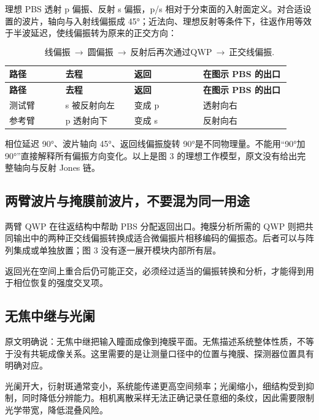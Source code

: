 \documentclass[UTF8,fontset=fandol,11pt,a4paper]{ctexart}
\begin{document}
理想 PBS 透射 p 偏振、反射 s 偏振，p/s 相对于分束面的入射面定义。对合适设置的波片，轴向与入射线偏振成 45°；近法向、理想反射等条件下，往返作用等效于半波延迟，使线偏振转为原来的正交方向：

\[
\text{线偏振}\ \longrightarrow\ \text{圆偏振}\ \longrightarrow\ \text{反射后再次通过QWP}\ \longrightarrow\ \text{正交线偏振}.
\]

{\small
\begin{longtable}{>{\raggedright\arraybackslash}p{0.18\linewidth}>{\raggedright\arraybackslash}p{0.22\linewidth}>{\raggedright\arraybackslash}p{0.22\linewidth}>{\raggedright\arraybackslash}p{0.29\linewidth}}
\toprule
\textbf{路径} & \textbf{去程} & \textbf{返回} & \textbf{在图示 PBS 的出口} \\
\midrule
\endfirsthead
\toprule
\textbf{路径} & \textbf{去程} & \textbf{返回} & \textbf{在图示 PBS 的出口} \\
\midrule
\endhead
测试臂 & s 被反射向左 & 变成 p & 透射向右 \\
参考臂 & p 透射向下 & 变成 s & 反射向右 \\
\bottomrule
\end{longtable}
}

相位延迟 90°、波片轴向 45°、返回线偏振旋转 90°是不同物理量。不能用“90°加90°”直接解释所有偏振方向变化。以上是图 3 的理想工作模型，原文没有给出完整轴向与反射 Jones 链。

\subsection{两臂波片与掩膜前波片，不要混为同一用途}

两臂 QWP 在往返结构中帮助 PBS 分配返回出口。掩膜分析所需的 QWP 则把共同输出中的两种正交线偏振转换成适合微偏振片相移编码的偏振态。后者可以与阵列集成或单独放置；图 3 没有逐一展开模块内部所有层。

返回光在空间上重合后仍可能正交，必须经过适当的偏振转换和分析，才能得到用于相位恢复的强度交叉项。

\subsection{无焦中继与光阑}

原文明确说：无焦中继把输入瞳面成像到掩膜平面。无焦描述系统整体性质，不等于没有共轭成像关系。这里需要的是让测量口径中的位置与掩膜、探测器位置具有明确对应。

光阑开大，衍射斑通常变小，系统能传递更高空间频率；光阑缩小，细结构受到抑制，同时降低分辨能力。相机离散采样无法正确记录任意细的条纹，因此需要限制光学带宽，降低混叠风险。
\end{document}

